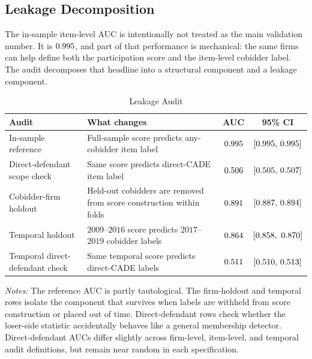 \subsection{Leakage Decomposition}
\label{app:leakage_submission}

The in-sample item-level AUC is intentionally not treated as the
main validation number. It is $0.995$, and part of that
performance is mechanical: the same firms can help define both
the participation score and the item-level cobidder label. The
audit decomposes that headline into a structural component and a
leakage component.

\begin{table}[htbp]
\centering
\caption{Leakage Audit}
\label{tab:leakage_audit_submission}
\footnotesize
\begin{adjustbox}{max width=\textwidth,center}
\begin{threeparttable}
\begin{tabular}{L{4.4cm}L{5.4cm}cc}
\toprule
Audit & What changes & AUC & 95\% CI \\
\midrule
In-sample reference & Full-sample score predicts any-cobidder item label
& $0.995$ & $[0.995,\,0.995]$ \\
Direct-defendant scope check & Same score predicts direct-CADE item label
& $0.506$ & $[0.505,\,0.507]$ \\
Cobidder-firm holdout & Held-out cobidders are removed from score construction within folds
& $0.891$ & $[0.887,\,0.894]$ \\
Temporal holdout & $2009$--$2016$ score predicts $2017$--$2019$ cobidder labels
& $0.864$ & $[0.858,\ 0.870]$ \\
Temporal direct-defendant check & Same temporal score predicts direct-CADE labels
& $0.511$ & $[0.510,\,0.513]$ \\
\bottomrule
\end{tabular}
\begin{tablenotes}
\footnotesize
\item \textit{Notes:} The reference AUC is partly tautological.
The firm-holdout and temporal rows isolate the component that
survives when labels are withheld from score construction or
placed out of time. Direct-defendant rows check whether the
loser-side statistic accidentally behaves like a general
membership detector.
Direct-defendant AUCs differ slightly across firm-level,
item-level, and temporal audit definitions, but remain near
random in each specification.
\end{tablenotes}
\end{threeparttable}
\end{adjustbox}
\end{table}

